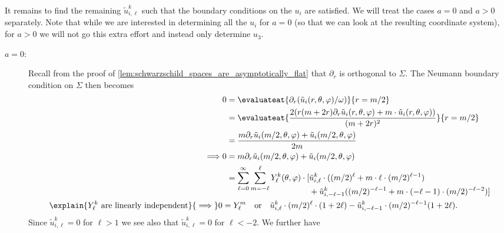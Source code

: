 \documentclass[titlepage,numbers=noenddot,headinclude,oneside,%
footinclude=true,cleardoublepage=empty,%
BCOR=5mm,paper=a4,fontsize=11pt,%
english,%
]{scrartcl}
\begin{document}
It remains to find the remaining \( \tilde{u}^k_{i,\ell} \) such that the boundary conditions on the \( u_i \) are satisfied. We will treat the cases \( a=0 \) and \( a>0 \) separately. Note that while we are interested in determining all the \( u_i \) for \( a=0 \) (so that we can look at the resulting coordinate system), for \( a>0 \) we will not go this extra effort and instead only determine \( u_3 \).
\begin{description}
    \item[\( a=0 \):] 
    Recall from the proof of \cref{lem:schwarzschild_spaces_are_asymptotically_flat} that \( \partial_r \) is orthogonal to \( \Sigma \). The Neumann boundary condition on \( \Sigma \) then becomes
    \begin{align*}
        &0\begin{aligned}[t]
            &=\evaluateat{\partial_{r} (\tilde{u}_i(r,\theta,\varphi)/\omega)}{r=m/2}\\
            &=\evaluateat{\frac{2(r(m+2r)\partial_r \tilde{u}_i(r,\theta,\varphi)+m\cdot \tilde{u}_i(r,\theta,\varphi))}{(m+2r)^2}}{r=m/2}\\
            &=\frac{m\partial_r \tilde{u}_i(m/2,\theta,\varphi)+\tilde{u}_i(m/2,\theta,\varphi)}{2m}
        \end{aligned}\\
        \implies &0\begin{aligned}[t]
            &=m \partial_r \tilde{u}_i(m/2,\theta,\varphi)+\tilde{u}_i(m/2,\theta,\varphi)\\
            &=\sum_{\ell=0}^\infty \sum_{m=-\ell}^\ell  Y_{\ell}^k(\theta,\varphi)\cdot  \begin{aligned}[t]
                [&\tilde{u}_{i,\ell}^k\cdot ((m/2)^\ell+m\cdot \ell\cdot (m/2)^{\ell-1})\\
                &+\tilde{u}^k_{i,-\ell-1}((m/2)^{-\ell-1}+m\cdot (-\ell-1)\cdot (m/2)^{-\ell-2})]
            \end{aligned}
        \end{aligned}\\
        \explain{\text{\( Y_{\ell}^k \) are linearly independent}}{\implies} 0&=Y^m_{\ell}\quad \text{or}\quad \tilde{u}_{i,\ell}^k\cdot (m/2)^\ell\cdot (1+2\ell)-\tilde{u}^k_{i,-\ell-1}\cdot (m/2)^{-\ell-1}(1+2\ell).
    \end{align*}
    Since \( \tilde{u}^k_{i,\ell}=0 \) for \( \ell>1 \) we see also that \( \tilde{u}^k_{i,\ell}=0 \) for \( \ell< -2 \). We further have
    \begin{align*}

\end{align*}
\end{description}
\end{document}
